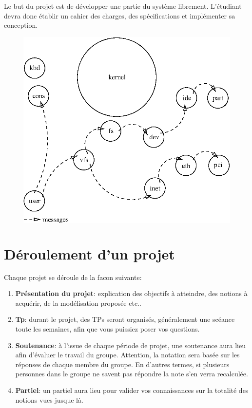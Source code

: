 \documentclass[10pt,a4wide]{article}
\begin{document}
Le but du projet est de d\'evelopper une partie du syst\`eme librement.
L'\'etudiant devra donc \'etablir un cahier des charges, des sp\'ecifications
et impl\'ementer sa conception.

\vspace{5cm}

\begin{figure}[h]
\centerline{\includegraphics{figures/k10.eps}}
\end{figure}

\newpage

\section{D\'eroulement d'un projet}

Chaque projet se d\'eroule de la facon suivante:

\begin{enumerate}

\item \textbf{Pr\'esentation du projet}: explication des objectifs \`a
      atteindre, des notions \`a acqu\'erir, de la mod\'elisation propos\'ee
      etc..

\item \textbf{Tp}: durant le projet, des TPs seront organis\'es,
      g\'en\'eralement une sc\'eance toute les semaines, afin que vous
      puissiez poser vos questions.

\item \textbf{Soutenance}: \`a l'issue de chaque p\'eriode de projet, une
      soutenance aura lieu afin d'\'evaluer le travail du groupe. Attention,
      la notation sera bas\'ee sur les r\'eponses de chaque membre du groupe.
      En d'autres termes, si plusieurs personnes dans le groupe ne savent
      pas r\'epondre la note s'en verra recalcul\'ee.

\item \textbf{Partiel}: un partiel aura lieu pour valider vos connaissances
      sur la totalit\'e des notions vues jusque l\`a.

\end{enumerate}
\end{document}
